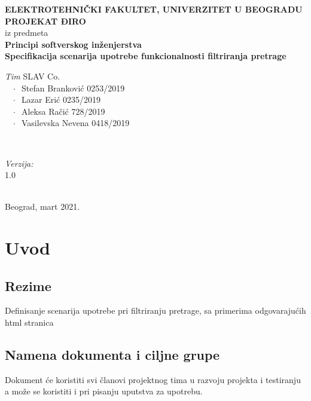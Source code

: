 \documentclass[12pt]{article}
\begin{document}
    \renewcommand{\labelenumii}{\arabic{enumi}.\arabic{enumii}}
	\begin{titlepage}  
		\center
		\textbf{ \LARGE ELEKTROTEHNIČKI FAKULTET, UNIVERZITET U BEOGRADU } \\[4cm]
		\textbf{ \Large PROJEKAT ĐIRO\texttrademark} \\[0.3cm]
		iz predmeta \\[0.3cm]
		\textbf{ \Large Principi softverskog inženjerstva} \\[0.7cm]
		{ \huge \bfseries Specifikacija scenarija upotrebe funkcionalnosti filtriranja pretrage } \\[6cm]
		

		\begin{minipage}{0.5\textwidth}
			\begin{flushleft}
				\large
				\emph{Tim} SLAV Co. \\
			     $\;\;\; \cdot \;\;$Stefan Branković  0253/2019\\
			     $\;\;\; \cdot \;\;$Lazar Erić 0235/2019\\
			     $\;\;\; \cdot \;\;$Aleksa Račić 728/2019\\
			     $\;\;\; \cdot \;\;$Vasilevska Nevena 0418/2019
			\end{flushleft}
		\end{minipage}
		~
		\begin{minipage}{0.4\textwidth}
			\begin{flushright}
				\large
				\emph{Verzija:} \\
				1.0
			\end{flushright}
		\end{minipage} \\[2cm]
		\enlargethispage{4\baselineskip}
		{ \large Beograd, mart 2021. }
		\vfill
	\end{titlepage}
\pagebreak
\tableofcontents
\pagebreak



\section{Uvod}
\subsection{Rezime}
Definisanje scenarija upotrebe pri filtriranju pretrage, sa primerima odgovarajućih html stranica
\subsection{Namena dokumenta i ciljne grupe}
Dokument će koristiti svi članovi projektnog tima u razvoju projekta i testiranju a može se koristiti i pri pisanju uputstva za
upotrebu.
\end{document}
